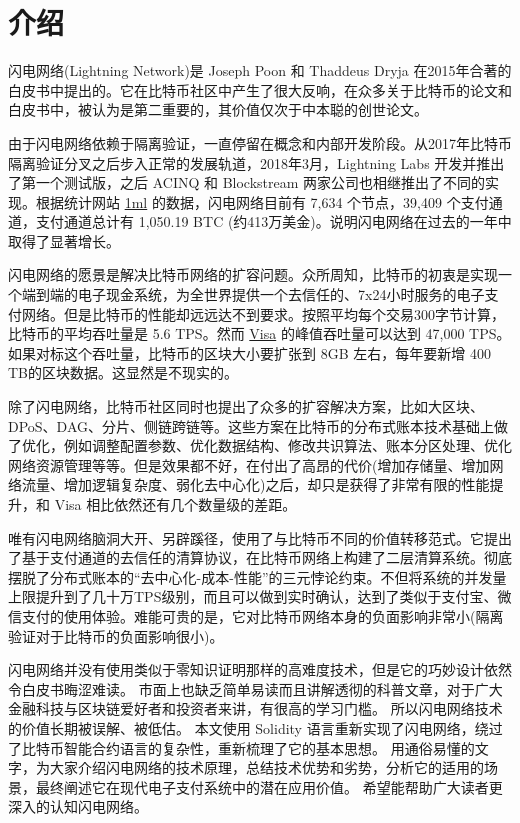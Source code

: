 \section{介绍}

闪电网络(Lightning Network)是 Joseph Poon 和 Thaddeus Dryja 在2015年合著的白皮书中提出的。它在比特币社区中产生了很大反响，在众多关于比特币的论文和白皮书中，被认为是第二重要的，其价值仅次于中本聪的创世论文。

由于闪电网络依赖于隔离验证，一直停留在概念和内部开发阶段。从2017年比特币隔离验证分叉之后步入正常的发展轨道，2018年3月，Lightning Labs 开发并推出了第一个测试版，之后 ACINQ 和 Blockstream 两家公司也相继推出了不同的实现。根据统计网站  \href{https://1ml.com/statistics}{1ml} 的数据，闪电网络目前有 7,634 个节点，39,409 个支付通道，支付通道总计有 1,050.19 BTC (约413万美金)。说明闪电网络在过去的一年中取得了显著增长。

闪电网络的愿景是解决比特币网络的扩容问题。众所周知，比特币的初衷是实现一个端到端的电子现金系统，为全世界提供一个去信任的、7x24小时服务的电子支付网络。但是比特币的性能却远远达不到要求。按照平均每个交易300字节计算，比特币的平均吞吐量是 5.6 TPS。然而 \href{https://www.visa.com/blogarchives/us/2013/10/10/stress-test-prepares-visanet-for-the-most-wonderful-time-of-the-year/index.html}{Visa} 的峰值吞吐量可以达到 47,000 TPS。如果对标这个吞吐量，比特币的区块大小要扩张到 8GB 左右，每年要新增 400 TB的区块数据。这显然是不现实的。

除了闪电网络，比特币社区同时也提出了众多的扩容解决方案，比如大区块、DPoS、DAG、分片、侧链跨链等。这些方案在比特币的分布式账本技术基础上做了优化，例如调整配置参数、优化数据结构、修改共识算法、账本分区处理、优化网络资源管理等等。但是效果都不好，在付出了高昂的代价(增加存储量、增加网络流量、增加逻辑复杂度、弱化去中心化)之后，却只是获得了非常有限的性能提升，和 Visa 相比依然还有几个数量级的差距。

唯有闪电网络脑洞大开、另辟蹊径，使用了与比特币不同的价值转移范式。它提出了基于支付通道的去信任的清算协议，在比特币网络上构建了二层清算系统。彻底摆脱了分布式账本的“去中心化-成本-性能”的三元悖论约束。不但将系统的并发量上限提升到了几十万TPS级别，而且可以做到实时确认，达到了类似于支付宝、微信支付的使用体验。难能可贵的是，它对比特币网络本身的负面影响非常小(隔离验证对于比特币的负面影响很小)。

闪电网络并没有使用类似于零知识证明那样的高难度技术，但是它的巧妙设计依然令白皮书晦涩难读。
市面上也缺乏简单易读而且讲解透彻的科普文章，对于广大金融科技与区块链爱好者和投资者来讲，有很高的学习门槛。
所以闪电网络技术的价值长期被误解、被低估。
本文使用 Solidity 语言重新实现了闪电网络，绕过了比特币智能合约语言的复杂性，重新梳理了它的基本思想。
用通俗易懂的文字，为大家介绍闪电网络的技术原理，总结技术优势和劣势，分析它的适用的场景，最终阐述它在现代电子支付系统中的潜在应用价值。
希望能帮助广大读者更深入的认知闪电网络。

